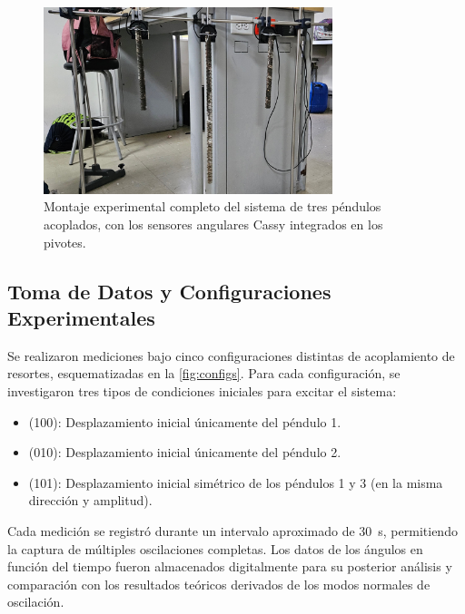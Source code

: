 \begin{figure}[htbp!]
  \centering
  \includegraphics[width=0.75\textwidth]{Figures/set-up.jpeg}
  \caption{Montaje experimental completo del sistema de tres
    p\'endulos acoplados, con los sensores angulares Cassy
  integrados en los pivotes.}
  \label{fig:montaje}
\end{figure}

\subsection*{Toma de Datos y Configuraciones Experimentales}

Se realizaron mediciones bajo cinco configuraciones distintas de
acoplamiento de resortes, esquematizadas en la \cref{fig:configs}.
Para cada configuraci\'on, se investigaron tres tipos de
condiciones iniciales para excitar el sistema:
\begin{itemize}
  \item (100): Desplazamiento inicial \'unicamente del p\'endulo 1.
  \item (010): Desplazamiento inicial \'unicamente del p\'endulo 2.
  \item (101): Desplazamiento inicial sim\'etrico de los p\'endulos
    1 y 3 (en la misma direcci\'on y amplitud).
\end{itemize}
Cada medici\'on se registr\'o durante un intervalo aproximado de
\qty{30}{\second}, permitiendo la captura de m\'ultiples
oscilaciones completas. Los datos de los \'angulos en funci\'on
del tiempo fueron almacenados digitalmente para su posterior
an\'alisis y comparaci\'on con los resultados te\'oricos derivados
de los modos normales de oscilaci\'on.


